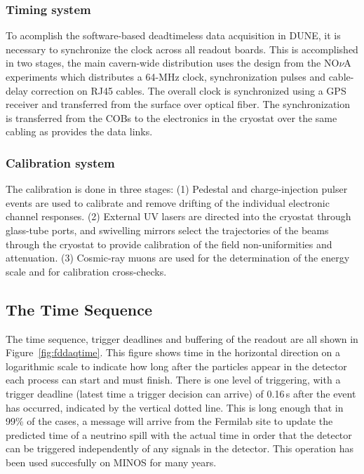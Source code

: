 \subsubsection{Timing system}
To acomplish the software-based deadtimeless data
acquisition in DUNE, it is necessary to synchronize the clock across
all readout boards.  This is accomplished in two stages, the main
cavern-wide distribution uses the design from the NO$\nu$A experiments
which distributes a 64-MHz clock, synchronization pulses and
cable-delay correction on RJ45 cables.  The overall clock is
synchronized using a GPS receiver and transferred from the surface
over optical fiber.  The synchronization is transferred from the COBs
to the electronics in the cryostat over the same cabling as provides
the data links.

\subsubsection{Calibration system}
The calibration is done in three stages: (1)
Pedestal and charge-injection pulser events are used to calibrate and
remove drifting of the individual electronic channel responses. (2)
External UV lasers are directed into the cryostat through glass-tube
ports, and swivelling mirrors select the trajectories of the beams
through the cryostat to provide calibration of the field
non-uniformities and attenuation. (3) Cosmic-ray muons are used for
the determination of the energy scale and for calibration
cross-checks.



\subsection{The Time Sequence}

The time sequence, trigger deadlines and buffering of the readout are all
shown in Figure~\ref{fig:fddaqtime}.  This figure shows time in the
horizontal direction on a logarithmic scale to indicate how long after
the particles appear in the detector each process can start and must
finish.  There is one level of triggering, with a trigger deadline
(latest time a trigger decision can arrive) of
0.16\,s after the event has occurred, indicated by the vertical dotted
line.  This is long enough that in 99\% of the cases, a message will
arrive from the Fermilab site to update the predicted time of a
neutrino spill with the actual time in order that the detector can be
triggered independently of any signals in the detector.  This
operation has been used succesfully on MINOS for many years.  

